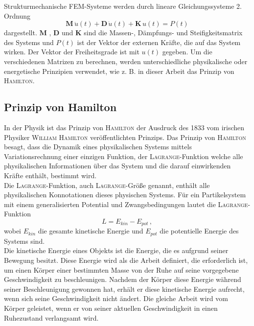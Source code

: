 \documentclass[a4paper,10pt,twoside]{article}
\numberwithin{equation}{section} %
\numberwithin{figure}{section}   %
\numberwithin{table}{section}    %
\begin{document}
	Strukturmechanische FEM-Systeme werden durch lineare Gleichungssysteme 2. Ordnung
	\begin{equation}\label{equ:FEM-Ansatzgleichung}
	\mathbf{M}\, \ddot{u}(t)+ \mathbf{D}\, \dot{u}(t)+ \mathbf{K}\, u(t) = P(t)
	\end{equation}
	dargestellt.
	$ \mathbf{M} $ , $ \mathbf{D} $ und $ \mathbf{K} $ sind die Massen-, Dämpfungs- und Steifigkeitsmatrix des Systems und $ P(t) $ ist der Vektor der externen Kräfte, die auf das System wirken.  Der Vektor der Freiheitsgrade ist mit $ u(t) $ gegeben. Um die verschiedenen Matrizen zu berechnen, werden unterschiedliche physikalische oder energetische Prinzipien verwendet, wie z. B. in dieser Arbeit das Prinzip von \textsc{Hamilton}.
	
	\subsection{Prinzip von Hamilton} \label{sec:prinzip-hamilton}
	In der Physik ist das Prinzip von \textsc{Hamilton} der Ausdruck des 1833 vom irischen Physiker \textsc{William Hamilton} veröffentlichten Prinzips. Das Prinzip von \textsc{Hamilton} besagt, dass die Dynamik eines physikalischen Systems mittels Variationsrechnung einer einzigen Funktion, der \textsc{Lagrange}-Funktion welche alle physikalischen Informationen über das System und die darauf einwirkenden Kräfte enthält, bestimmt wird. \\
	
	Die \textsc{Lagrange}-Funktion, auch \textsc{Lagrange}-Größe genannt, enthält alle physikalischen Konnotationen dieses physischen Systems. Für ein Partikelsystem mit einem generalisierten Potential und Zwangsbedingungen lautet die \textsc{Lagrange}-Funktion
	\begin{equation}\label{equ:lagrange-funktion}
	L = E_{kin} - E_{pot} \, ,
	\end{equation}
	wobei $ E_{kin} $  die gesamte kinetische Energie und $ E_{pot} $ die potentielle Energie des Systems sind. \\
	
	Die kinetische Energie eines Objekts ist die Energie, die es aufgrund seiner Bewegung besitzt. Diese Energie wird als die Arbeit definiert, die erforderlich ist, um einen Körper einer bestimmten Masse von der Ruhe auf seine vorgegebene Geschwindigkeit zu beschleunigen. Nachdem der Körper diese Energie während seiner Beschleunigung gewonnen hat, erhält er diese kinetische Energie aufrecht, wenn sich seine Geschwindigkeit nicht ändert. Die gleiche Arbeit wird vom Körper geleistet, wenn er von seiner aktuellen Geschwindigkeit in einen Ruhezustand verlangsamt wird.\\
	
\end{document}
